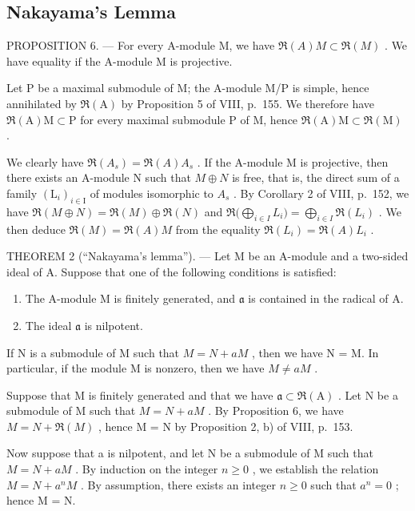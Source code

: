 \subsection{Nakayama's Lemma}

PROPOSITION 6. --- For every A-module M, we have \(\Re(A)M \subset \Re(M)\) . We have equality if the A-module M is projective.

Let P be a maximal submodule of M; the A-module M/P is simple, hence annihilated by \(\Re(\mathrm{A})\) by Proposition 5 of VIII, p.~155. We therefore have \(\Re(\mathrm{A})\mathrm{M}\subset\mathrm{P}\) for every maximal submodule P of M, hence \(\Re(\mathrm{A})\mathrm{M}\subset\Re(\mathrm{M})\) .

We clearly have \(\mathfrak{R}(A_{s})=\mathfrak{R}(A)A_{s}\) . If the A-module M is projective, then there exists an A-module N such that \(M\oplus N\) is free, that is, the direct sum of a family \((\mathrm{L}_{i})_{i\in\mathrm{I}}\) of modules isomorphic to \(A_{s}\) . By Corollary 2 of VIII, p.~152, we have \(\mathfrak{R}(M\oplus N)=\mathfrak{R}(M)\oplus\mathfrak{R}(N)\) and \(\mathfrak{R}\big(\bigoplus_{i\in I}L_{i}\big)=\bigoplus_{i\in I}\mathfrak{R}(L_{i})\) . We then deduce \(\mathfrak{R}(M)=\mathfrak{R}(A)M\) from the equality \(\mathfrak{R}(L_{i})=\mathfrak{R}(A)L_{i}\) .

THEOREM 2 (``Nakayama's lemma''). --- Let M be an A-module and a two-sided ideal of A. Suppose that one of the following conditions is satisfied:

\begin{enumerate}
\def\labelenumi{(\roman{enumi})}
\item
  The A-module M is finitely generated, and \(\mathfrak{a}\) is contained in the radical of A.
\item
  The ideal \(\mathfrak{a}\) is nilpotent.
\end{enumerate}

If N is a submodule of M such that \(M = N + aM\) , then we have N = M. In particular, if the module M is nonzero, then we have \(M \neq aM\) .

Suppose that M is finitely generated and that we have \(\mathfrak{a} \subset \Re(\mathrm{A})\) . Let N be a submodule of M such that \(M = N + aM\) . By Proposition 6, we have \(M = N + \Re(M)\) , hence M = N by Proposition 2, b) of VIII, p.~153.

Now suppose that a is nilpotent, and let N be a submodule of M such that \(M = N + aM\) . By induction on the integer \(n \geqslant 0\) , we establish the relation \(M = N + a^{n}M\) . By assumption, there exists an integer \(n \geqslant 0\) such that \(a^{n} = 0\) ; hence M = N.

